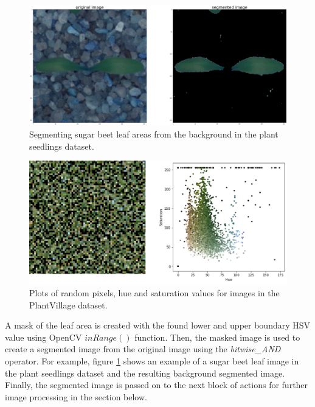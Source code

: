 \begin{figure}[!htb]
    \centering
    \includegraphics[scale=0.18, keepaspectratio]{Figures/segmen_sugar.png}
    \caption{Segmenting sugar beet leaf areas from the background in the plant seedlings dataset.}
    \label{fig:my_segmen_sugar}
\end{figure}


\begin{figure}[!htb]
    \centering
    \includegraphics[scale=0.4, keepaspectratio]{Figures/notebook/rand_pixels.png}
    \caption{Plots of random pixels, hue and saturation values for images in the PlantVillage dataset.}
    \label{fig:my_hsv}
\end{figure} 

A mask of the leaf area is created with the found lower and upper boundary HSV value using OpenCV $inRange()$ function. Then, the masked image is used to create a segmented image from the original image using the \textit{bitwise\_AND} operator. For example, figure \ref{fig:my_segmen_sugar} shows an example of a sugar beet leaf image in the plant seedlings dataset and the resulting background segmented image. Finally, the segmented image is passed on to the next block of actions for further image processing in the section below.

